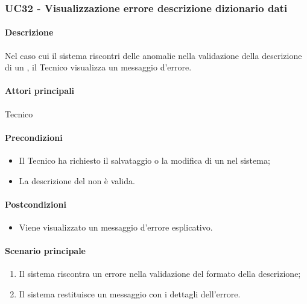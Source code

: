 \subsubsection{UC32 - Visualizzazione errore descrizione dizionario dati}\label{UC32}
\paragraph*{Descrizione}
Nel caso cui il sistema riscontri delle anomalie nella validazione della descrizione di un , il Tecnico visualizza un messaggio d'errore.

\paragraph*{Attori principali}
Tecnico

\paragraph*{Precondizioni}
\begin{itemize}
  \item Il Tecnico ha richiesto il salvataggio o la modifica di un  nel sistema;
  \item La descrizione del  non è valida.
\end{itemize}

\paragraph*{Postcondizioni}
\begin{itemize}
  \item Viene visualizzato un messaggio d'errore esplicativo.
\end{itemize}

\paragraph*{Scenario principale}
\begin{enumerate}
  \item Il sistema riscontra un errore nella validazione del formato della descrizione;
  \item Il sistema restituisce un messaggio con i dettagli dell'errore.  
\end{enumerate}